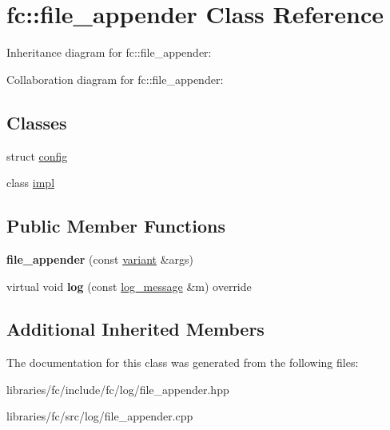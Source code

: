 \hypertarget{classfc_1_1file__appender}{}\section{fc\+:\+:file\+\_\+appender Class Reference}
\label{classfc_1_1file__appender}


Inheritance diagram for fc\+:\+:file\+\_\+appender\+:


Collaboration diagram for fc\+:\+:file\+\_\+appender\+:
\subsection*{Classes}
\begin{DoxyCompactItemize}
\item 
struct \mbox{\hyperlink{structfc_1_1file__appender_1_1config}{config}}
\item 
class \mbox{\hyperlink{classfc_1_1file__appender_1_1impl}{impl}}
\end{DoxyCompactItemize}
\subsection*{Public Member Functions}
\begin{DoxyCompactItemize}
\item 
\mbox{\label{classfc_1_1file__appender_a26d2226061bd77f1951489bf884fee3f}} 
{\bfseries file\+\_\+appender} (const \mbox{\hyperlink{classfc_1_1variant}{variant}} \&args)
\item 
\mbox{\label{classfc_1_1file__appender_a4c0e43755b4390e185ca604c34bd59d6}} 
virtual void {\bfseries log} (const \mbox{\hyperlink{classfc_1_1log__message}{log\+\_\+message}} \&m) override
\end{DoxyCompactItemize}
\subsection*{Additional Inherited Members}


The documentation for this class was generated from the following files\+:\begin{DoxyCompactItemize}
\item 
libraries/fc/include/fc/log/file\+\_\+appender.\+hpp\item 
libraries/fc/src/log/file\+\_\+appender.\+cpp\end{DoxyCompactItemize}
